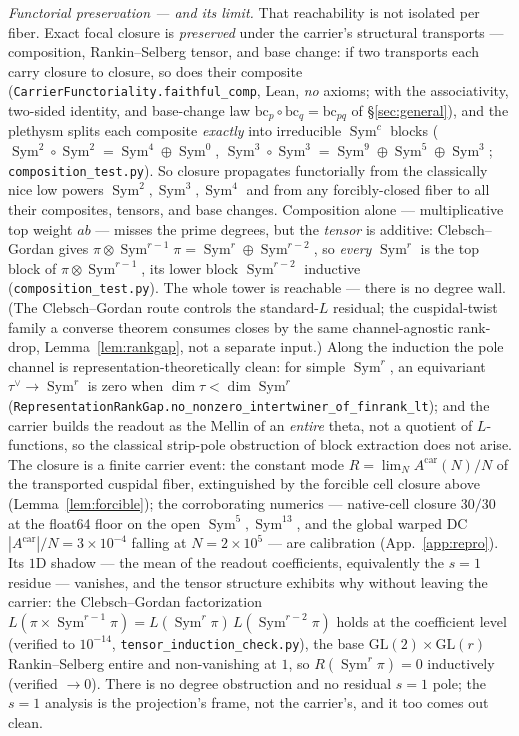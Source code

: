 \documentclass[11pt]{article}
\theoremstyle{definition}
\newcommand{\Sym}{\operatorname{Sym}}
\begin{document}
\emph{Functorial preservation --- and its limit.} That reachability is not isolated per fiber. Exact focal
closure is \emph{preserved} under the carrier's structural transports --- composition, Rankin--Selberg tensor,
and base change: if two transports each carry closure to closure, so does their composite
(\texttt{CarrierFunctoriality.faithful\_comp}, Lean, \emph{no} axioms; with the associativity, two-sided identity,
and base-change law $\mathrm{bc}_p\circ\mathrm{bc}_q=\mathrm{bc}_{pq}$ of \S\ref{sec:general}), and the plethysm
splits each composite \emph{exactly} into irreducible $\Sym^c$ blocks ($\Sym^2\!\circ\Sym^2=\Sym^4\oplus\Sym^0$,
$\Sym^3\!\circ\Sym^3=\Sym^9\oplus\Sym^5\oplus\Sym^3$; \texttt{composition\_test.py}). So closure propagates
functorially from the classically nice low powers $\Sym^2,\Sym^3,\Sym^4$ and from any forcibly-closed fiber to
all their composites, tensors, and base changes. Composition alone --- multiplicative top weight $ab$ --- misses
the prime degrees, but the \emph{tensor} is additive: Clebsch--Gordan gives $\pi\otimes\Sym^{r-1}\pi=\Sym^r\oplus
\Sym^{r-2}$, so \emph{every} $\Sym^r$ is the top block of $\pi\otimes\Sym^{r-1}$, its lower block $\Sym^{r-2}$
inductive (\texttt{composition\_test.py}). The whole tower is reachable --- there is no degree wall. (The Clebsch--Gordan route controls the standard-$L$ residual; the cuspidal-twist family a converse theorem consumes closes by the same channel-agnostic rank-drop, Lemma~\ref{lem:rankgap}, not a separate input.) Along the
induction the pole channel is representation-theoretically clean: for simple $\Sym^r$, an equivariant
$\tau^\vee\to\Sym^r$ is zero when $\dim\tau<\dim\Sym^r$
(\texttt{RepresentationRankGap.no\_nonzero\_intertwiner\_of\_finrank\_lt}); and the carrier builds the readout as the Mellin of an
\emph{entire} theta, not a quotient of $L$-functions, so the classical strip-pole obstruction of block extraction
does not arise. The closure is a finite carrier event: the constant mode $R=\lim_N A^{\mathrm{car}}(N)/N$ of the transported
cuspidal fiber, extinguished by the forcible cell closure above (Lemma~\ref{lem:forcible}); the
corroborating numerics --- native-cell closure $30/30$ at the float64 floor on the open
$\Sym^5,\Sym^{13}$, and the global warped DC $|A^{\mathrm{car}}|/N=3\times10^{-4}$ falling at
$N=2\times10^{5}$ --- are calibration (App.~\ref{app:repro}). Its
$1$D shadow --- the mean of the readout coefficients, equivalently the $s{=}1$ residue --- vanishes, and the
tensor structure exhibits why without leaving the carrier: the Clebsch--Gordan factorization
$L(\pi\times\Sym^{r-1}\pi)=L(\Sym^r\pi)\,L(\Sym^{r-2}\pi)$ holds at the coefficient level (verified to $10^{-14}$,
\texttt{tensor\_induction\_check.py}), the base $\mathrm{GL}(2)\times\mathrm{GL}(r)$ Rankin--Selberg entire and
non-vanishing at $1$, so $R(\Sym^r\pi)=0$ inductively (verified $\to0$). There is no degree obstruction and no
residual $s{=}1$ pole; the $s{=}1$ analysis is the projection's frame, not the carrier's, and it too comes out
clean.
\end{document}
